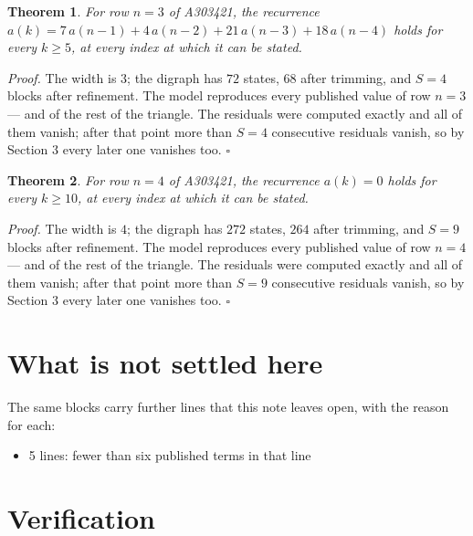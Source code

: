 \documentclass[11pt]{article}
\newtheorem{theorem}{Theorem}
\theoremstyle{definition}
\begin{document}
\begin{theorem} For row $n = 3$ of A303421, the recurrence $a(k) = 7\,a(n-1) + 4\,a(n-2) + 21\,a(n-3) + 18\,a(n-4)$ holds for every $k \ge 5$, at every index at which it can be stated.\end{theorem}

{\itshape Proof.} The width is $3$; the digraph has $72$ states, $68$ after trimming, and $S = 4$ blocks after refinement. The model reproduces every published value of row $n = 3$ --- and of the rest of the triangle. The residuals were computed exactly and all of them vanish; after that point more than $S = 4$ consecutive residuals vanish, so by Section 3 every later one vanishes too. $\square$

\begin{theorem} For row $n = 4$ of A303421, the recurrence $a(k) = 0$ holds for every $k \ge 10$, at every index at which it can be stated.\end{theorem}

{\itshape Proof.} The width is $4$; the digraph has $272$ states, $264$ after trimming, and $S = 9$ blocks after refinement. The model reproduces every published value of row $n = 4$ --- and of the rest of the triangle. The residuals were computed exactly and all of them vanish; after that point more than $S = 9$ consecutive residuals vanish, so by Section 3 every later one vanishes too. $\square$

\section{What is not settled here}

The same blocks carry further lines that this note leaves open, with the reason for each:

\begin{itemize}

\item 5 lines: fewer than six published terms in that line

\end{itemize}

\section{Verification}
\end{document}
